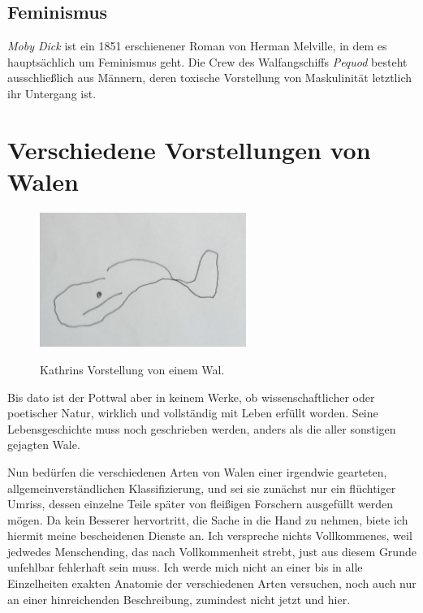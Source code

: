 \documentclass[a5paper,9pt,twoside=false]{extbook}
\begin{document}
\medskip

\subsection*{Feminismus}
\textit{Moby Dick} ist ein 1851 erschienener Roman von Herman Melville, in dem es hauptsächlich um Feminismus geht. Die Crew des Walfangschiffs \textit{Pequod} besteht ausschließlich aus Männern, deren toxische Vorstellung von Maskulinität letztlich ihr Untergang ist.


\newpage
\section*{Verschiedene Vorstellungen von Walen}\label{walmalen}
\vspace{-15pt}

\begin{figure}[h]
{ \centering
\includegraphics[width=0.6\textwidth]{kathrins_wal.jpg} \\
} \caption{Kathrins Vorstellung von einem Wal.}
\end{figure}

\noindent Bis dato ist der Pottwal aber in keinem Werke, ob wissenschaftlicher oder poetischer Natur, wirklich und vollständig mit Leben erfüllt worden. Seine Lebensgeschichte muss noch geschrieben werden, anders als die aller sonstigen gejagten Wale.

Nun bedürfen die verschiedenen Arten von Walen einer irgendwie gearteten, allgemeinverständlichen Klassifizierung, und sei sie zunächst nur ein flüchtiger Umriss, dessen einzelne Teile später von fleißigen Forschern ausgefüllt werden mögen. Da kein Besserer hervortritt, die Sache in die Hand zu nehmen, biete ich hiermit meine bescheidenen Dienste an. Ich verspreche nichts Vollkommenes, weil jedwedes Menschending, das nach Vollkommenheit strebt, just aus diesem Grunde unfehlbar fehlerhaft sein muss. Ich werde mich nicht an einer bis in alle Einzelheiten exakten Anatomie der verschiedenen Arten versuchen, noch auch nur an einer hinreichenden Beschreibung, zumindest nicht jetzt und hier.
\end{document}

